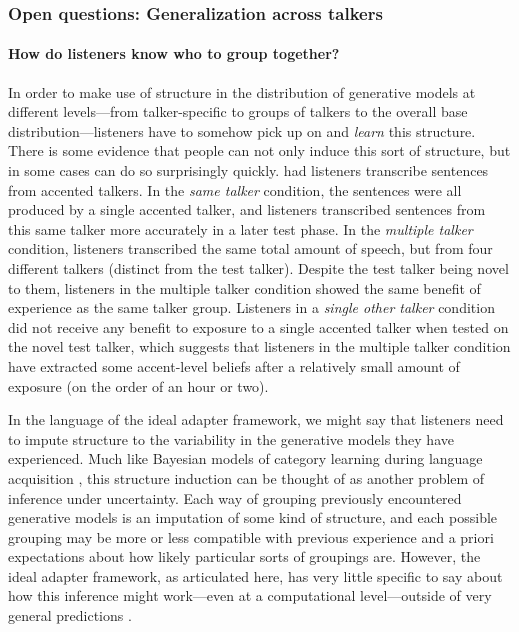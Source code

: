 \subsubsection{Open questions: Generalization across talkers }
\label{sec:open-questions-gen}
\label{r1-gen-questions}

\paragraph{How do listeners know who to group together?}
\label{sec:how-do-listeners}

In order to make use of structure in the distribution of generative models at different levels---from talker-specific to groups of talkers to the overall base distribution---listeners have to somehow pick up on and \emph{learn} this structure.  There is some evidence that people can not only induce this sort of structure, but in some cases can do so surprisingly quickly.  \textcite{Bradlow2008} had listeners transcribe sentences from accented talkers.  In the \emph{same talker} condition, the sentences were all produced by a single accented talker, and listeners transcribed sentences from this same talker more accurately in a later test phase.  In the \emph{multiple talker} condition, listeners transcribed the same total amount of speech, but from four different talkers (distinct from the test talker).  Despite the test talker being novel to them, listeners in the multiple talker condition showed the same benefit of experience as the same talker group.  Listeners in a \emph{single other talker} condition did not receive any benefit to exposure to a single accented talker when tested on the novel test talker, which suggests that listeners in the multiple talker condition have extracted some accent-level beliefs after a relatively small amount of exposure (on the order of an hour or two).

In the language of the ideal adapter framework, we might say that listeners need to impute structure to the variability in the generative models they have experienced.  Much like Bayesian models of category learning during language acquisition \autocite[e.g.][]{Feldman2013a,Perfors2011}, this structure induction can be thought of as another problem of inference under uncertainty.  Each way of grouping previously encountered generative models is an imputation of some kind of structure, and each possible grouping may be more or less compatible with previous experience and a priori expectations about how likely particular sorts of groupings are.  However, the ideal adapter framework, as articulated here, has very little specific to say about how this inference might work---even at a computational level---outside of very general predictions \autocites[e.g. simpler groupings are naturally preferred because of the Occam's razor property of Bayesian inference;][]{Perfors2011}[pp. 343-356]{Mackay2003}.

